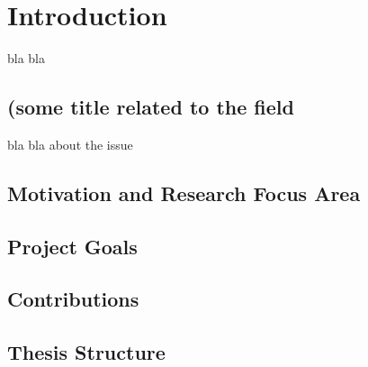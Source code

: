 \chapter{Introduction}
\label{cha:introduction}
\glsresetall

bla bla

\section{(some title related to the field}
\label{sec:field}

bla bla about the issue

\section{Motivation and Research Focus Area}
\label{sec:motivation}

\section{Project Goals}
\label{sec:project_goals}

\section{Contributions}

\section{Thesis Structure}

